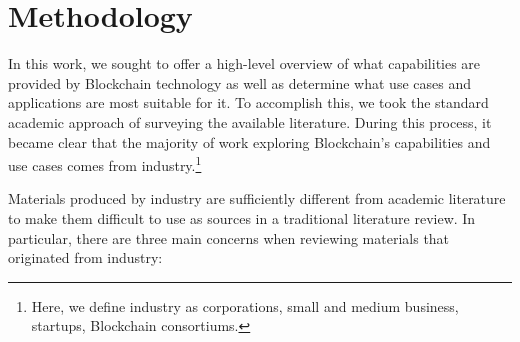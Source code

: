 
\section{Methodology}
In this work, we sought to offer a high-level overview of what capabilities are provided by Blockchain technology as well as determine what use cases and applications are most suitable for it.
To accomplish this, we took the standard academic approach of surveying the available literature.
During this process, it became clear that the majority of work exploring Blockchain's capabilities and use cases comes from industry.\footnote{Here, we define industry as corporations, small and medium business, startups, Blockchain consortiums.}

Materials produced by industry are sufficiently different from academic literature to make them difficult to use as sources in a traditional literature review.
In particular, there are three main concerns when reviewing materials that originated from industry:

